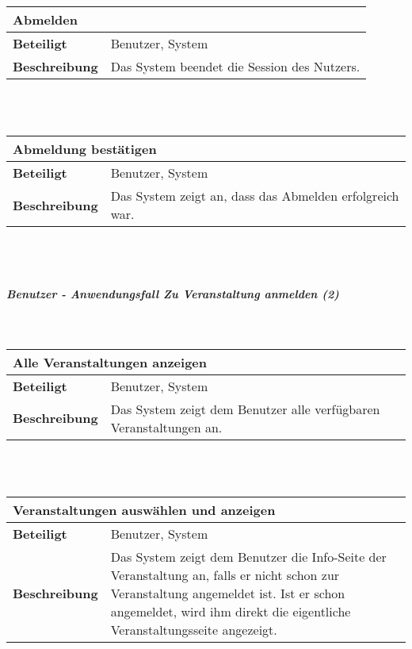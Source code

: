 \documentclass[12pt,a4paper]{article}
\begin{document}
\begin{tabular}{l p{10cm}}
\multicolumn{2}{l}{\textbf{Abmelden}} \\ \hline
\textbf{Beteiligt} & Benutzer, System \\ \hline 
\textbf{Beschreibung} & Das System beendet die Session des Nutzers.\\ 
\hline 
\end{tabular}\\\\

\begin{tabular}{l p{10cm}}
\multicolumn{2}{l}{\textbf{Abmeldung bestätigen}} \\ \hline
\textbf{Beteiligt} & Benutzer, System \\ \hline 
\textbf{Beschreibung} & Das System zeigt an, dass das Abmelden erfolgreich war.\\ 
\hline 
\end{tabular}\\\\
\subparagraph{Benutzer - Anwendungsfall \glqq Zu Veranstaltung anmelden \grqq (2)}\mbox{}\\

\begin{tabular}{l p{10cm}}
\multicolumn{2}{l}{\textbf{Alle Veranstaltungen anzeigen}} \\ \hline
\textbf{Beteiligt} & Benutzer, System \\ \hline 
\textbf{Beschreibung} & Das System zeigt dem Benutzer alle verfügbaren Veranstaltungen an.\\ 
\hline 
\end{tabular}\\\\

\begin{tabular}{l p{10cm}}
\multicolumn{2}{l}{\textbf{Veranstaltungen auswählen und anzeigen}} \\ \hline
\textbf{Beteiligt} & Benutzer, System \\ \hline 
\textbf{Beschreibung} & Das System zeigt dem Benutzer die Info-Seite der Veranstaltung an, falls er nicht schon zur Veranstaltung angemeldet ist. Ist er schon angemeldet, wird ihm direkt die eigentliche Veranstaltungsseite angezeigt.\\ 
\hline 
\end{tabular}\\\\
\end{document}
